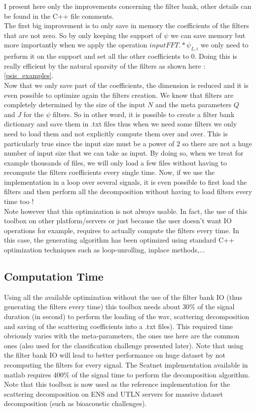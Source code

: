 \documentclass[a4paper]{report}
\begin{document}
I present here only the improvements concerning the filter bank, other details can be found in the C++ file comments.\\ 
The first big improvement is to only save in memory the coefficients of the filters that are not zero. So by only keeping the support of $\psi$ we can save memory but more importantly when we apply the operation $inputFFT .* \psi_{L,i}$ we only need to perform it on the support and set all the other coefficients to $0$. Doing this is really efficient by the natural sparsity of the filters as shown here : \ref{psis_examples}.
\\
Now that we only save part of the coefficients, the dimension is reduced and it is even possible to optimize again the filters creation. We know that filters are completely determined by the size of the input $N$ and the meta parameters $Q$ and $J$ for the $\psi$ filters. So in other word, it is possible to create a filter bank dictionary and save them in .txt files thus when we need some filters we only need to load them and not explicitly compute them over and over. This is particularly true since the input size must be a power of $2$ so there are not a huge number of input size that we can take as input.
By doing so, when we treat for example thousands of files, we will only load a few files without having to recompute the filters coefficients every single time.
Now, if we use the implementation in a loop over several signals, it is even possible to first load the filters and then perform all the decomposition without having to load filters every time too ! 
\\Note however that this optimization is not always usable. In fact, the use of this toolbox on other platform/servers or just because the user doesn't want IO operations for example, requires to actually compute the filters every time. In this case, the generating algorithm has been optimized using standard C++ optimization techniques such as loop-unrolling, inplace methods,...

\subsection{Computation Time}

Using all the available optimization without the use of the filter bank IO (thus generating the filters every time) this toolbox needs about $30\%$ of the signal duration (in second) to perform the loading of the wav, scattering decomposition and saving of the scattering coefficients into a .txt files). This required time obviously varies with the meta-parameters, the ones use here are the common ones (also used for the classification challenge presented later).
Note that using the filter bank IO will lead to better performance on huge dataset by not recomputing the filters for every signal.
The Scatnet implementation available in matlab requires $400\%$ of the signal time to perform the decomposition algorithm.
\\
Note that this toolbox is now used as the reference implementation for the scattering decomposition on ENS and UTLN servers for massive dataset decomposition (such as bioacoustic challenges). 
\end{document}
